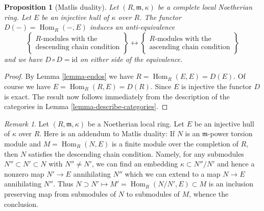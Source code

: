\documentclass{stacks-project}
\theoremstyle{plain}
\newtheorem{proposition}[subsection]{Proposition}
\theoremstyle{definition}
\theoremstyle{remark}
\newtheorem{remark}[subsection]{Remark}
\numberwithin{equation}{subsection}
\def\Hom{\mathop{\mathrm{Hom}}\nolimits}
\begin{document}
\begin{proposition}[Matlis duality]
\label{proposition-matlis}
Let $(R, \mathfrak m, \kappa)$ be a complete local Noetherian ring.
Let $E$ be an injective hull of $\kappa$ over $R$. The functor
$D(-) = \Hom_R(-, E)$ induces an anti-equivalence
$$
\left\{
\begin{matrix}
R\text{-modules with the} \\
\text{descending chain condition}
\end{matrix}
\right\}
\longleftrightarrow
\left\{
\begin{matrix}
R\text{-modules with the} \\
\text{ascending chain condition}
\end{matrix}
\right\}
$$
and we have $D \circ D = \text{id}$ on either side of the equivalence.
\end{proposition}

\begin{proof}
By Lemma \ref{lemma-endos} we have $R = \Hom_R(E, E) = D(E)$.
Of course we have $E = \Hom_R(R, E) = D(R)$. Since $E$ is injective
the functor $D$ is exact. The result now follows immediately from the
description of the categories in
Lemma \ref{lemma-describe-categories}.
\end{proof}

\begin{remark}
\label{remark-matlis}
Let $(R, \mathfrak m, \kappa)$ be a Noetherian local ring.
Let $E$ be an injective hull of $\kappa$ over $R$. Here is an
addendum to Matlis duality: If $N$ is an $\mathfrak m$-power torsion module
and $M = \Hom_R(N, E)$ is a finite module over the completion of $R$,
then $N$ satisfies the descending chain condition. Namely, for any
submodules $N'' \subset N' \subset N$ with $N'' \not = N'$, we can
find an embedding $\kappa \subset N''/N'$ and hence a nonzero
map $N' \to E$ annihilating $N''$ which we can extend to a map $N \to E$
annihilating $N''$. Thus $N \supset N' \mapsto M' = \Hom_R(N/N', E) \subset M$
is an inclusion preserving map from submodules of $N$ to submodules
of $M$, whence the conclusion.
\end{remark}
\end{document}
